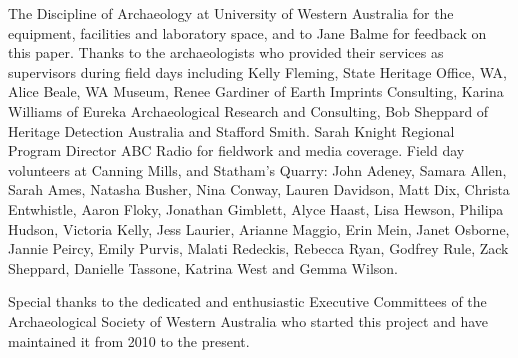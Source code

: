 \documentclass[%
]{ijsra}
\begin{document}
	
	The Discipline of Archaeology at University of Western Australia for the equipment, facilities and laboratory space, and to Jane Balme for feedback on this paper. Thanks to the archaeologists who provided their services as supervisors during field days including Kelly Fleming, State Heritage Office, WA, Alice Beale, WA Museum, Renee Gardiner of Earth Imprints Consulting, Karina Williams of Eureka Archaeological Research and Consulting, Bob Sheppard of Heritage Detection Australia and Stafford Smith. Sarah Knight Regional Program Director ABC Radio for fieldwork and media coverage. Field day volunteers at Canning Mills, and Statham’s Quarry: John Adeney, Samara Allen, Sarah Ames, Natasha Busher, Nina Conway, Lauren Davidson, Matt Dix, Christa Entwhistle, Aaron Floky, Jonathan Gimblett, Alyce Haast, Lisa Hewson, Philipa Hudson, Victoria Kelly, Jess Laurier, Arianne Maggio, Erin Mein, Janet Osborne, Jannie Peircy, Emily Purvis, Malati Redeckis, Rebecca Ryan, Godfrey Rule, Zack Sheppard, Danielle Tassone, Katrina West and Gemma Wilson.
	
	Special thanks to the dedicated and enthusiastic Executive Committees of the Archaeological Society of Western Australia who started this project and have maintained it from 2010 to the present.
	
	
	
	
	
	
	\IJSRAclosing
\end{document}
